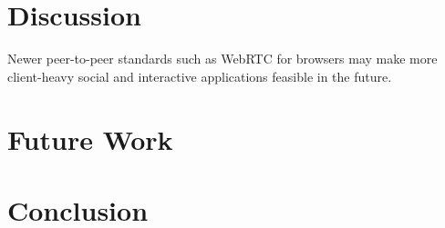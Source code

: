 \documentclass{vldb}
\begin{document}
\section{Discussion}


Newer peer-to-peer standards such as WebRTC for browsers may make more client-heavy social and interactive applications feasible in the future.

\section{Future Work}

\section{Conclusion}



\end{document}
